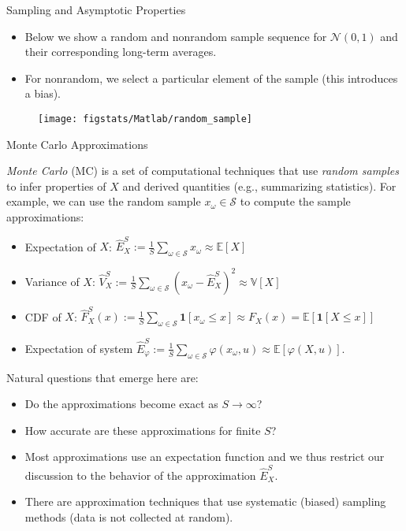 \documentclass[9pt]{beamer}
\begin{document}
%
\begin{frame}{Sampling and Asymptotic Properties}
\begin{itemize}
\item Below we show a random and nonrandom sample sequence for $\mathcal{N}(0,1)$ and their corresponding long-term  averages. 
\item For nonrandom, we select a particular element of the sample (this introduces a bias). 
\end{itemize}
\begin{figure}[!htb]
    \centering
	\texttt{[image: figstats/Matlab/random\_sample]}
\end{figure}

\end{frame}

%
\begin{frame}{Monte Carlo Approximations}

{\em Monte Carlo} (MC) is a set of computational techniques that use {\em random samples} to infer properties of $X$ and derived quantities (e.g., summarizing statistics).  For example, we can use the random sample $x_\omega \in \mathcal{S}$ to compute the sample approximations:
\begin{block}{}
\begin{itemize}
\item Expectation of $X$: $\hat{E}_X^S:=\frac{1}{S}\sum_{\omega \in \mathcal{S}}x_\omega\approx \mathbb{E}[X]$
\item Variance of $X$: $\hat{V}_X^S:=\frac{1}{S}\sum_{\omega \in \mathcal{S}}(x_\omega-\hat{E}_X^S)^2\approx \mathbb{V}[X]$
\item CDF of $X$: $\hat{F}_X^S(x):=\frac{1}{S}\sum_{\omega 
\in \mathcal{S}}\mathbf{1}[x_\omega \leq x]\approx F_X(x)=\mathbb{E}[{\mathbf{1}[X \leq x]}]$
\item Expectation of system $\hat{E}_\varphi^S:=\frac{1}{S}\sum_{\omega 
\in \mathcal{S}}\varphi(x_\omega,u)\approx \mathbb{E}[{\varphi(X,u)}]$. 
\end{itemize}
\end{block}
Natural questions that emerge here are: 
\begin{block}{}
\begin{itemize}
\item Do the approximations become exact as $S\to \infty$?
\item How accurate are these approximations for finite $S$?
\end{itemize}
\end{block}
\begin{itemize}
\item Most approximations use an expectation function and we thus restrict our discussion to the behavior of the approximation $\hat{E}_X^S$. 
\item There are approximation techniques that use systematic (biased) sampling methods (data is not collected at random). 
\end{itemize}
\end{frame}
\end{document}
